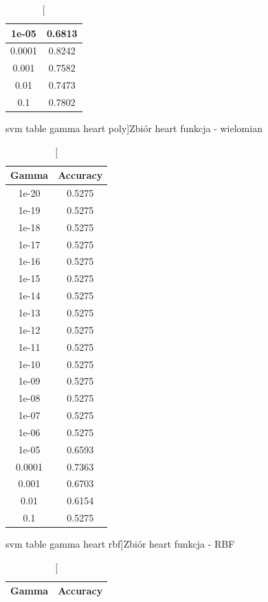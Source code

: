 \documentclass{classrep}
\begin{document}
{{\begin{table}[!htbp]
\begin{minipage}{.35\textwidth}
\begin{tabular}{|c|c|}
1e-05 & 0.6813 \\ \hline
0.0001 & 0.8242 \\ \hline
0.001 & 0.7582 \\ \hline
0.01 & 0.7473 \\ \hline
0.1 & 0.7802 \\ \hline
        \end{tabular}
        \caption
        [svm table gamma  heart poly]{Zbiór heart funkcja - wielomian}
		\label{svm_table_gamma_heart_poly}
    \end{minipage}
    \hfill
    \begin{minipage}{.3\textwidth}
        \centering
        \begin{tabular}{|c|c|}
            \hline
			Gamma & Accuracy \\ \hline
			1e-20 & 0.5275 \\ \hline
1e-19 & 0.5275 \\ \hline
1e-18 & 0.5275 \\ \hline
1e-17 & 0.5275 \\ \hline
1e-16 & 0.5275 \\ \hline
1e-15 & 0.5275 \\ \hline
1e-14 & 0.5275 \\ \hline
1e-13 & 0.5275 \\ \hline
1e-12 & 0.5275 \\ \hline
1e-11 & 0.5275 \\ \hline
1e-10 & 0.5275 \\ \hline
1e-09 & 0.5275 \\ \hline
1e-08 & 0.5275 \\ \hline
1e-07 & 0.5275 \\ \hline
1e-06 & 0.5275 \\ \hline
1e-05 & 0.6593 \\ \hline
0.0001 & 0.7363 \\ \hline
0.001 & 0.6703 \\ \hline
0.01 & 0.6154 \\ \hline
0.1 & 0.5275 \\ \hline
        \end{tabular}
        \caption
		[svm table gamma heart rbf]{Zbiór heart funkcja - RBF}
        \label{svn_table_gamma_heart_rbf}
    \end{minipage}
    \hfill
    \begin{minipage}{.3\textwidth}
        \centering
        \begin{tabular}{|c|c|}
            \hline
			Gamma & Accuracy \\ \hline

\end{tabular}
\end{minipage}
\end{table}}}
\end{document}
